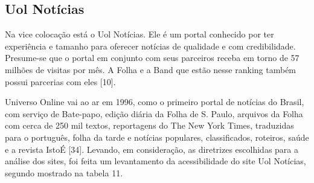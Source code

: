 \documentclass[a4paper]{article}
\begin{document}
\begin{titlepage}
\subsection{Uol Notícias}

Na vice colocação está o Uol Notícias. Ele é um portal conhecido por ter experiência e tamanho para oferecer notícias de qualidade e com credibilidade. Presume-se que o portal em conjunto com seus parceiros receba em torno de 57 milhões de visitas por mês. A Folha e a Band que estão nesse ranking também possui parcerias com eles [10].

Universo Online vai ao ar em 1996, como o primeiro portal de notícias do Brasil, com serviço de Bate-papo, edição diária da Folha de S. Paulo, arquivos da Folha com cerca de 250 mil textos, reportagens do The New York Times, traduzidas para o português, folha da tarde e notícias populares, classificados, roteiros, saúde e a revista IstoÉ [34]. Levando, em consideração, as diretrizes escolhidas para a análise dos sites, foi feita um levantamento da acessibilidade do site Uol Notícias, segundo mostrado na tabela 11.\\


\end{titlepage}
\end{document}
